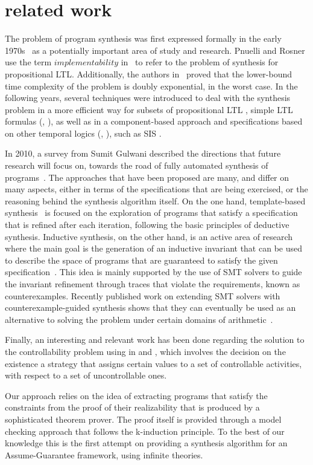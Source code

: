 \section{related work}
\label{sec:related work}

The problem of program synthesis was first expressed formally in the early
1970s~\cite{manna1971toward} as a potentially important area of study and
research. 
Pnuelli and Rosner use the term
$\textit{implementability}$ in~\cite{Pnueli89} to refer to the problem of synthesis for
propositional LTL. Additionally, the authors in~\cite{Pnueli89} proved that the
lower-bound time complexity of the problem is doubly exponential, in the worst
case. In the following years, several techniques were introduced to deal with
the synthesis problem in a more efficient way for subsets of propositional LTL
\cite{Klein10}, simple LTL formulas (\cite{Bohy12}, \cite{Tini03}), as well as
in a component-based approach \cite{Chatterjee07} and specifications based on
other temporal logics (\cite{benevs2012factorization}, \cite{Hamza10}), such as SIS
\cite{Aziz95}.

In 2010, a survey from Sumit Gulwani described the 
directions that future research will focus on, towards the
road of fully automated synthesis of programs~\cite{gulwani2010dimensions}.
%
The approaches that have been proposed are many, and differ on many aspects,
either in terms of the specifications that are being exercised, or the reasoning
behind the synthesis algorithm itself. On the one hand, template-based
synthesis~\cite{srivastava2013template} is focused on the exploration of
programs that satisfy a specification that is refined after each
iteration, following the basic principles of deductive synthesis. Inductive
synthesis, on the other hand, is an active area of research where the main goal
is the generation of an inductive invariant that can be used to describe the
space of programs that are guaranteed to satisfy the given
specification~\cite{flener2001inductive}.
This idea is mainly supported by the use of SMT solvers to guide the invariant
refinement through traces that violate the requirements, known as
counterexamples. Recently published work on extending SMT solvers with
counterexample-guided synthesis shows that they can eventually be
used as an alternative to solving the problem under certain domains of
arithmetic~\cite{reynoldscounterexample}.

Finally, an interesting and relevant work has been done regarding the solution
to the controllability problem using in \cite{micheli_aaai_2012}
\cite{micheli_cp_2012} and \cite{micheli_constraints_2014}, which involves the
decision on the existence a strategy that assigns certain values to a set of
controllable activities, with respect to a set of uncontrollable ones.

Our approach relies on the idea of extracting programs that satisfy the
constraints from the proof of their realizability that is produced by a
sophisticated theorem prover. The proof itself is provided
through a model checking approach that follows the k-induction principle. To the
best of our knowledge this is the first attempt on providing a synthesis
algorithm for an Assume-Guarantee framework, using infinite theories.
